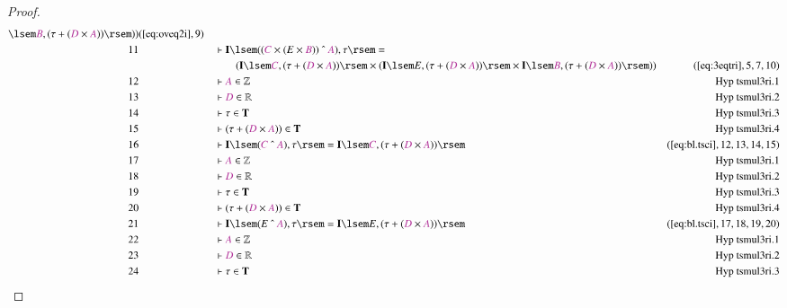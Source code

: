 \begin{proof}
\begin{align}
      \lsem \mc{B} , ( \tau + ( \mc{D} \times \mc{A} ) )
      \rsem ) )&(\mbox{\ref{eq:oveq2i}},9)\notag
  \\ 11 &&  & \vdash \mathbf{I} \lsem ( ( \mc{C} \times ( E \times \mc{B} ) )
      ~\string^~ \mc{A} ) , \tau \rsem =  \notag \\ & & & \qquad
     ( \mathbf{I} \lsem
      \mc{C} , ( \tau + ( \mc{D} \times \mc{A} ) ) \rsem
      \times ( \mathbf{I} \lsem E , ( \tau + ( \mc{D} \times
      \mc{A} ) ) \rsem \times \mathbf{I} \lsem \mc{B} , (
      \tau + ( \mc{D} \times \mc{A} ) ) \rsem )
      )&(\mbox{\ref{eq:3eqtri}},5,7,10)\notag
  \\ 12 &&  & \vdash \mc{A} \in
      \mathbb{Z}&\text{Hyp~tsmul3ri.1}\notag%
  \\ 13 &&  & \vdash \mc{D} \in
      \mathbb{R}&\text{Hyp~tsmul3ri.2}\notag%
  \\ 14 &&  & \vdash \tau \in
      \mathbf{T}&\text{Hyp~tsmul3ri.3}\notag%
  \\ 15 &&  & \vdash ( \tau + ( \mc{D} \times \mc{A} ) ) \in
      \mathbf{T}&\text{Hyp~tsmul3ri.4}\notag%
  \\ 16 &&  & \vdash \mathbf{I} \lsem ( \mc{C} ~\string^~ \mc{A} ) , \tau \rsem
      = \mathbf{I} \lsem \mc{C} , ( \tau + ( \mc{D} \times
      \mc{A} ) )
      \rsem&(\mbox{\ref{eq:bl.tsci}},12,13,14,15)\notag
  \\ 17 &&  & \vdash \mc{A} \in
      \mathbb{Z}&\text{Hyp~tsmul3ri.1}\notag%
  \\ 18 &&  & \vdash \mc{D} \in
      \mathbb{R}&\text{Hyp~tsmul3ri.2}\notag%
  \\ 19 &&  & \vdash \tau \in
      \mathbf{T}&\text{Hyp~tsmul3ri.3}\notag%
  \\ 20 &&  & \vdash ( \tau + ( \mc{D} \times \mc{A} ) ) \in
      \mathbf{T}&\text{Hyp~tsmul3ri.4}\notag%
  \\ 21 &&  & \vdash \mathbf{I} \lsem ( E ~\string^~ \mc{A} ) , \tau \rsem =
      \mathbf{I} \lsem E , ( \tau + ( \mc{D} \times \mc{A} )
      ) \rsem&(\mbox{\ref{eq:bl.tsci}},17,18,19,20)\notag
  \\ 22 &&  & \vdash \mc{A} \in
      \mathbb{Z}&\text{Hyp~tsmul3ri.1}\notag%
  \\ 23 &&  & \vdash \mc{D} \in
      \mathbb{R}&\text{Hyp~tsmul3ri.2}\notag%
  \\ 24 &&  & \vdash \tau \in
      \mathbf{T}&\text{Hyp~tsmul3ri.3}\notag%

\end{align}
\end{proof}
